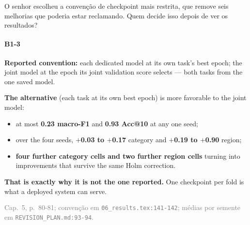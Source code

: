 \documentclass{beamer}
\begin{document}
\begin{frame}[noframenumbering]{O senhor escolheu a convenção de checkpoint mais restrita, que remove seis melhorias que poderia estar reclamando. Quem decide isso depois de ver os resultados?}
    \framesubtitle{B1-3}
    \hypertarget{b13}{}
    \small
    \textbf{Reported convention:} each dedicated model at its own task's best epoch; the joint model at the epoch its joint validation score selects --- both tasks from the one saved model.

    \textbf{The alternative} (each task at its own best epoch) is more favorable to the joint model:
    \begin{itemize}\setlength{\itemsep}{0pt}\setlength{\parskip}{0pt}
        \item at most \textbf{0.23 macro-F1} and \textbf{0.93 Acc@10} at any one seed;
        \item over the four seeds, \textbf{$+$0.03 to $+$0.17} category and \textbf{$+$0.19 to $+$0.90} region;
        \item \textbf{four further category cells and two further region cells} turning into improvements that survive the same Holm correction.
    \end{itemize}
    \textcolor{alert}{\textbf{That is exactly why it is not the one reported.}} One checkpoint per fold is what a deployed system can serve.
    \vfill
    {\scriptsize
    \begin{minipage}[b]{0.775\linewidth}\raggedright\textcolor{gray}{Cap.~5, p.~80-81; convenção em \texttt{06\_results.tex:141-142}; médias por semente em \texttt{REVISION\_PLAN.md:93-94}.}\end{minipage}\hfill
    \begin{minipage}[b]{0.20\linewidth}\raggedleft \hyperlink{b0}{}\end{minipage}}
\end{frame}
\end{document}
